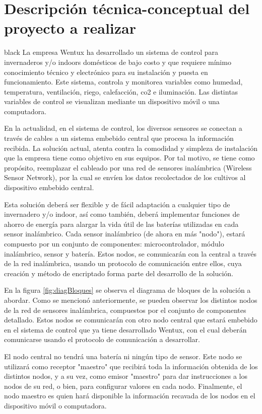 \documentclass[11pt]{charter}
\begin{document}
\section{Descripción técnica-conceptual del proyecto a realizar}
\label{sec:descripcion}

\begin{consigna}{black}
La empresa Wentux ha desarrollado un sistema de control para invernaderos y/o indoors domésticos de bajo costo y que requiere mínimo conocimiento técnico y electrónico para su instalación y puesta en funcionamiento. Este sistema, controla y monitorea variables como humedad, temperatura, ventilación, riego, calefacción, co2 e iluminación.
Las distintas variables de control se visualizan mediante un dispositivo móvil o una computadora.

En la actualidad, en el sistema de control, los diversos sensores se conectan a través de cables a un sistema embebido central que procesa la información recibida. La solución actual, atenta contra la comodidad y simpleza de instalación que la empresa tiene como objetivo en sus equipos. Por tal motivo, se tiene como propósito, reemplazar el cableado por una red de sensores inalámbrica (Wireless Sensor Network), por la cual se envíen los datos recolectados de los cultivos al dispositivo embebido central.

Esta solución deberá ser flexible y de fácil adaptación a cualquier tipo de invernadero y/o indoor, así como también, deberá implementar funciones de ahorro de energía para alargar la vida útil de las baterías utilizadas en cada sensor inalámbrico.
Cada sensor inalámbrico (de ahora en más "nodo"), estará compuesto por un conjunto de componentes: microcontrolador, módulo inalámbrico, sensor y batería. Estos nodos, se comunicarán con la central a través de la red inalámbrica, usando un protocolo de comunicación entre ellos, cuya creación y método de encriptado forma parte del desarrollo de la solución.

En la figura \ref{fig:diagBloques} se observa el diagrama de bloques de la solución a abordar. Como se mencionó anteriormente, se pueden observar los distintos nodos de la red de sensores inalámbrica, compuestos por el conjunto de componentes detallado. Estos nodos se comunicarán con otro nodo central que estará embebido en el sistema de control que ya tiene desarrollado Wentux, con el cual deberán comunicarse usando el protocolo de comunicación a desarrollar.

El nodo central no tendrá una batería ni ningún tipo de sensor. Este nodo se utilizará como receptor "maestro" {} que recibirá toda la información obtenida de los distintos nodos, y a su vez, como emisor  "maestro" {} para dar instrucciones a los nodos de su red, o bien, para configurar valores en cada nodo.
Finalmente, el nodo maestro es quien hará disponible la información recavada de los nodos en el dispositivo móvil o computadora.


\end{consigna}
\end{document}
